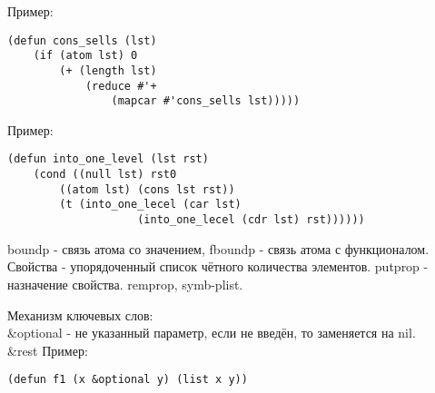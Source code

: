 Пример:
\begin{lstlisting}
(defun cons_sells (lst)
	(if (atom lst) 0
		(+ (length lst)
			(reduce #'+
				(mapcar #'cons_sells lst)))))
\end{lstlisting}

Пример:
\begin{lstlisting}
(defun into_one_level (lst rst)
	(cond ((null lst) rst0
		((atom lst) (cons lst rst))
		(t (into_one_lecel (car lst)
					(into_one_lecel (cdr lst) rst))))))
\end{lstlisting}

boundp - связь атома со значением, fboundp - связь атома с функционалом. Свойства - упорядоченный список чётного количества элементов. putprop - назначение свойства. remprop, symb-plist.

Механизм ключевых слов:\\
\&optional - не указанный параметр, если не введён, то заменяется на nil.\\
\&rest
Пример:
\begin{lstlisting}
(defun f1 (x &optional y) (list x y))
\end{lstlisting}
